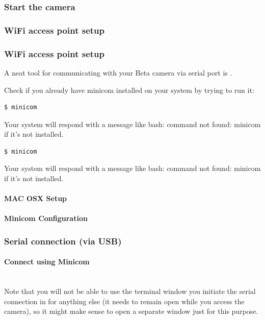 \subsubsection{Start the camera}
\subsubsection{WiFi access point setup}

\subsubsection{WiFi access point setup}


A neat tool for communicating with your Beta camera via serial port is .

Check if you already have minicom installed on your system by trying to run it:

\begin{lstlisting}[language=bash,morekeywords=$,keywordstyle=\bfseries,frame=none,xleftmargin=.25in,belowskip=2em, aboveskip=2em]
$ minicom
\end{lstlisting}
Your system will respond with a message like bash: command not found: minicom if it's not installed.

\begin{lstlisting}[language=bash,morekeywords=$,keywordstyle=\bfseries,frame=none,xleftmargin=.25in,belowskip=2em, aboveskip=2em]
$ minicom
\end{lstlisting}

Your system will respond with a message like bash: command not found: minicom if it's not installed.





\paragraph{MAC OSX Setup}
\paragraph{Minicom Configuration}
\subsubsection{Serial connection (via USB)}
\paragraph{Connect using Minicom}\mbox{}\\
Note that you will not be able to use the terminal window you initiate the serial connection in for anything else (it needs to remain open while you access the camera), so it might make sense to open a separate window just for this purpose.

